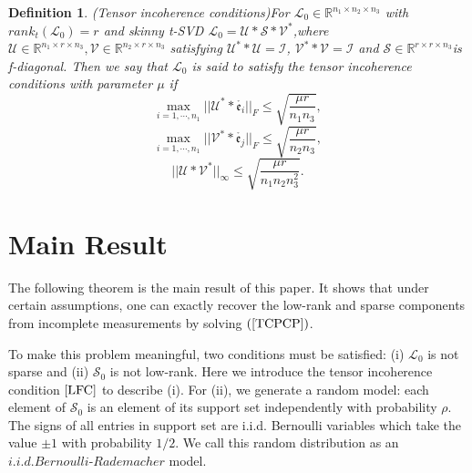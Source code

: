 \documentclass[journal,transmag]{IEEEtran}
\newtheorem{definition}{Definition}[section]
\theoremstyle{plain}
\begin{document}
\begin{definition} (Tensor incoherence conditions)For $\mathcal{L}_0\in \mathbb{R}^{n_1\times n_2 \times n_3}$ with $rank_t(\mathcal{L}_0)=r$ and skinny t-SVD $\mathcal{L}_0=\mathcal{U}*\mathcal{S}*\mathcal{V}^*$,where $\mathcal{U}\in \mathbb{R}^{n_1\times r \times n_3},\mathcal{V}\in \mathbb{R}^{n_2\times r\times n_3}$ satisfying $\mathcal{U}^* *\mathcal{U}=\mathcal{I}$, $\mathcal{V}^* *\mathcal{V}=\mathcal{I}$ and $\mathcal{S}\in \mathbb{R}^{r\times r\times n_3}$is f-diagonal. Then we say that $\mathcal{L}_0$ is said to satisfy the tensor incoherence conditions with parameter $\mu$ if
\begin{equation}
\max_{i=1,\cdots,n_1}||\mathcal{U}^* * \mathring{\mathfrak{e}_i}||_F\le \sqrt{\frac{\mu r}{n_1 n_3}},
\end{equation}
\begin{equation}
\max_{i=1,\cdots,n_1}||\mathcal{V}^* * \mathring{\mathfrak{e}_j}||_F\le \sqrt{\frac{\mu r}{n_2 n_3}},
\end{equation}
\begin{equation}
||\mathcal{U} * \mathcal{V}^*||_{\infty}\le \sqrt{\frac{\mu r}{n_1 n_2 n_3^2}}.
\end{equation}
\end{definition}

\section{Main Result}
The following theorem is the main result of this paper. It shows that under certain assumptions, one can exactly recover the low-rank and sparse components from incomplete measurements by solving $(\ref{TCPCP})$.

To make this problem meaningful, two conditions must be satisfied: (i) $\mathcal{L}_0$ is not sparse and (ii) $\mathcal{S}_0$ is not low-rank. Here we introduce the tensor incoherence condition $\cite{LFC}$ to describe (i). For (ii), we generate a random model: each element of $\mathcal{S}_0$ is an element of its support set independently with probability $\rho$. The signs of all entries in support set are i.i.d. Bernoulli variables which take the value $\pm 1$ with probability $1/2$. We call this random distribution as an $i.i.d. Bernoulli$-$Rademacher$ model.
\end{document}
